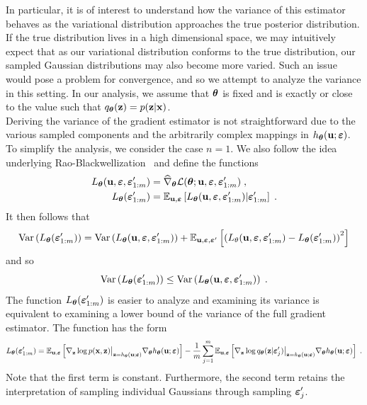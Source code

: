 \documentclass[10pt]{article}
\begin{document}
In particular, it is of interest to understand how the variance of this estimator behaves as the variational distribution approaches the true posterior distribution. If the true distribution lives in a high dimensional space, we may intuitively expect that as our variational distribution conforms to the true distribution, our sampled Gaussian distributions may also become more varied. Such an issue would pose a problem for convergence, and so we attempt to analyze the variance in this setting. In our analysis, we assume that ${\bm{\theta}}$ is fixed and is exactly or close to the value such that $q_{\bm{\theta}}(\mathbf{z})=p(\mathbf{z}|\mathbf{x})$.
\\

Deriving the variance of the gradient estimator is not straightforward due to the various sampled components and the arbitrarily complex mappings in $h_{\bm{\theta}}(\mathbf{u};\bm{\varepsilon})$. To simplify the analysis, we consider the case $n=1$. We also follow the idea underlying Rao-Blackwellization~\citep{Ranganath:2014} and define the functions
\begin{align*}
L_{\bm{\theta}}(\mathbf{u},\bm{\varepsilon},\bm{\varepsilon}_{1:m}') &= \widehat{\nabla}_{\bm{\theta}}\mathcal{L}({\bm{\theta}};\mathbf{u},\bm{\varepsilon},\bm{\varepsilon}_{1:m}') \;, \\
L_{\bm{\theta}}(\bm{\varepsilon}_{1:m}') &= \mathbb{E}_{\mathbf{u},\bm{\varepsilon}}\left[L_{\bm{\theta}}(\mathbf{u},\bm{\varepsilon},\bm{\varepsilon}_{1:m}')|\bm{\varepsilon}_{1:m}'\right] \;.
\end{align*}
It then follows that
\[
\mathrm{Var}\left(L_{\bm{\theta}}(\bm{\varepsilon}_{1:m}')\right) = \mathrm{Var}\left(L_{\bm{\theta}}(\mathbf{u},\bm{\varepsilon},\bm{\varepsilon}_{1:m}')\right) + \mathbb{E}_{\mathbf{u},\bm{\varepsilon},\bm{\varepsilon}'}\left[\left(L_\theta(\mathbf{u},\bm{\varepsilon},\bm{\varepsilon}_{1:m}')-L_{\bm{\theta}}(\bm{\varepsilon}_{1:m}')\right)^2\right]
\]
and so
\[
\mathrm{Var}\left(L_{\bm{\theta}}(\bm{\varepsilon}_{1:m}')\right) \leq \mathrm{Var}\left(L_{\bm{\theta}}(\mathbf{u},\bm{\varepsilon},\bm{\varepsilon}_{1:m}')\right) \;.
\]
The function $L_{\bm{\theta}}(\bm{\varepsilon}_{1:m}')$ is easier to analyze and examining its variance is equivalent to examining a lower bound of the variance of the full gradient estimator. The function has the form
\[
L_{\bm{\theta}}(\bm{\varepsilon}_{1:m}') = \mathbb{E}_{\mathbf{u},\bm{\varepsilon}}\left[\nabla_{\mathbf{z}}\log p(\mathbf{x},\mathbf{z})\big|_{\mathbf{z}=h_{\bm{\theta}}(\mathbf{u};\bm{\varepsilon})}\nabla_{\bm{\theta}} h_{\bm{\theta}}(\mathbf{u};\bm{\varepsilon})\right] - \frac{1}{m}\sum_{j=1}^m\mathbb{E}_{\mathbf{u},\bm{\varepsilon}}\left[\nabla_{\mathbf{z}}\log q_{\bm{\theta}}(\mathbf{z}|\bm{\varepsilon}_j')\big|_{\mathbf{z}=h_{\bm{\theta}}(\mathbf{u};\bm{\varepsilon})} \nabla_{\bm{\theta}} h_{\bm{\theta}}(\mathbf{u};\bm{\varepsilon})\right] \;.
\]
Note that the first term is constant. Furthermore, the second term retains the interpretation of sampling individual Gaussians through sampling $\bm{\varepsilon}_j'$.
\\
\end{document}
